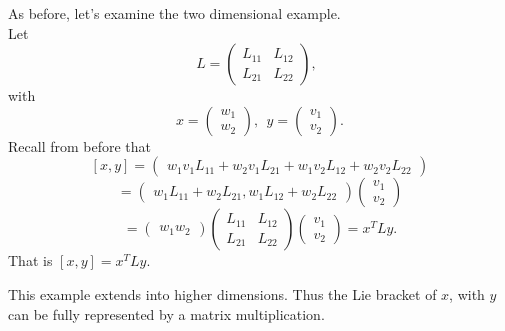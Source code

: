 \documentclass[11 pt]{article}
\newcommand{\br}[2]{\left[#1,#2\right]}
\begin{document}
    \begin{example}
        As before, let's examine the two dimensional example.
\\    Let
    $$
     L = \begin{pmatrix}
            L_{11} & L_{12} \\
            L_{21} & L_{22}
         \end{pmatrix},\ \ 
    $$
    with
    $$
     x = \begin{pmatrix}
            w_1\\
            w_2
         \end{pmatrix},\ \ 
     y = \begin{pmatrix}
             v_1\\
             v_2
         \end{pmatrix}.
    $$
    Recall from before that 
    $$
    \br{x}{y} = \begin{pmatrix}
                    w_1v_1L_{11} + w_2v_1L_{21} + w_1v_2L_{12}+w_2v_2L_{22}
                \end{pmatrix}
    $$
    $$
        = \begin{pmatrix}
            w_1L_{11} + w_2L_{21}, w_1L_{12}+w_2L_{22}
        \end{pmatrix}
        \begin{pmatrix}
            v_1 \\
            v_2
        \end{pmatrix}
    $$
    $$
        = \begin{pmatrix}
            w_1 w_2
        \end{pmatrix}
        \begin{pmatrix}
            L_{11} & L_{12} \\
            L_{21} & L_{22}
        \end{pmatrix}
        \begin{pmatrix}
            v_1 \\
            v_2
        \end{pmatrix}
        = x^{T}Ly.
    $$
    That is
    $\br{x}{y} = x^TLy$.
    \end{example}
    This example extends into higher dimensions.  Thus the Lie bracket of $x$,
    with $y$ can be fully represented by a matrix multiplication.
\end{document}
